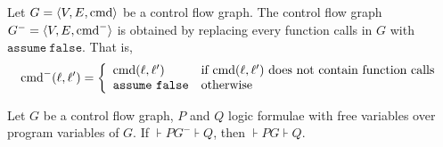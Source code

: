 
Let $G = \langle V, E, \textmd{cmd} \rangle$ be a control flow
graph. The control flow graph $G^- = \langle V, E,
\textmd{cmd}^- \rangle$ is obtained by replacing every
function calls in $G$ with $\mathtt{assume\ false}$. That is,
\begin{equation*}
  \textmd{cmd}^- (\ell, \ell') =
  \left\{
    \begin{array}{ll}
      \textmd{cmd} (\ell, \ell') & 
      \textmd{if } \textmd{cmd} (\ell, \ell') 
      \textmd{ does not contain function calls}\\
      \mathtt{assume\ false} &
      \textmd{otherwise}
    \end{array}
  \right.
\end{equation*}

\begin{proposition}
  Let $G$ be a control flow graph, $P$ and $Q$ logic formulae with
  free variables over program variables of $G$. If $\assert{P}
  G^- \assert{Q}$, then 
  $\assert{P} G \assert{Q}$.
\end{proposition}